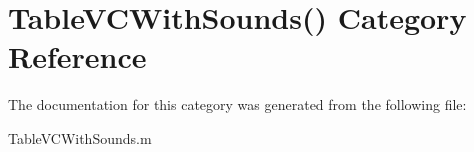 \hypertarget{category_table_v_c_with_sounds_07_08}{\section{Table\-V\-C\-With\-Sounds() Category Reference}
\label{category_table_v_c_with_sounds_07_08}
}


The documentation for this category was generated from the following file\-:\begin{DoxyCompactItemize}
\item 
Table\-V\-C\-With\-Sounds.\-m\end{DoxyCompactItemize}
